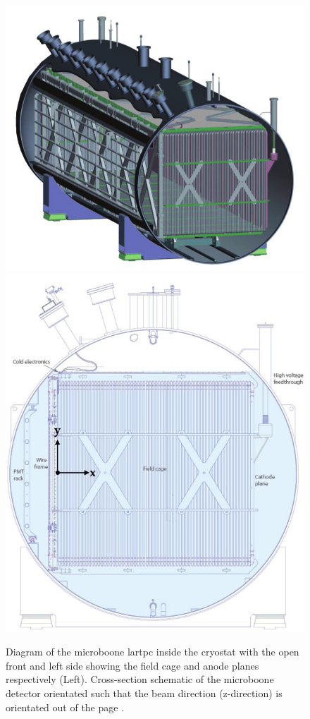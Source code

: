 \begin{figure}[h!]
    \centering
    \includegraphics[width = \smallfigwidth]{figures-chap3/MicroBooNE.png}
    \includegraphics[width = \smallfigwidth]{figures-chap3/MicroBooNE_cross-section.jpg}
    \caption[MicroBooNE detector.]{Diagram of the \gls{microboone} \gls{lartpc} inside the cryostat with the open front and left side showing the field cage and anode planes respectively (Left). Cross-section schematic of the \gls{microboone} detector orientated such that the beam direction (z-direction) is orientated out of the page \cite{microboone_detector}.}
    \label{fig:microboone}
\end{figure}

